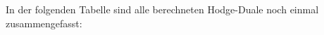 \begin{comment}
	\\
	&=
	-1 \cdot 1 \cdot 1 \cdot \operatorname{vol}(M) \Rightarrow s = -1
	\\
	\Rightarrow \ast (dx^0 \wedge dx^2 \wedge dx^3) 
	&= - dx^1
\\
\\
	\ast \underbrace{dx^1 \wedge dx^2 \wedge dx^3}_{\omega}
	&=
	s \, dx^0
	\\
	\omega \wedge \ast \omega 
	&=
	dx^1 \wedge dx^2 \wedge dx^3 \wedge s \, dx^0
	\\
	&=
	-s \, dx^0 \wedge dx^1 \wedge dx^2 \wedge dx^3
	\\
	\omega \wedge \ast \omega
	&=
	\langle dx^1 \wedge dx^2 \wedge dx^3 , dx^1 \wedge dx^2 \wedge dx^3 \rangle \, \operatorname{vol}(M)
	\\
	&=
	g^{11} \cdot g^{22} \cdot g^{33} \cdot \operatorname{vol}(M)
	\\
	&=
	1 \cdot 1 \cdot 1 \cdot \operatorname{vol}(M) \Rightarrow s = -1
	\\
	\Rightarrow \ast (dx^1 \wedge dx^2 \wedge dx^3) 
	&= - dx^0
\end{align*}
\end{comment}
In der folgenden Tabelle sind alle berechneten Hodge-Duale noch einmal zusammengefasst:

